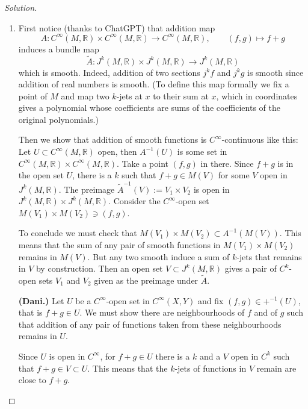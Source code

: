 \begin{proof}[Solution]
\begin{enumerate}[label=(\alph*)]
\item 
	First notice (thanks to ChatGPT) that addition map
	\[A: C^\infty(M,\mathbb{R}) \times C^\infty(M,\mathbb{R}) \to C^\infty(M,\mathbb{R}),\qquad  (f,g)\mapsto  f+g\]
	induces a bundle map
\[\tilde{A}:J^{k}(M,\mathbb{R})\times J^{k}(M,\mathbb{R})\longrightarrow J^{k}(M,\mathbb{R})\]
which is smooth. Indeed, addition of two sections \(j^kf\) and \(j^kg\) is smooth since addition of real numbers is smooth. (To define this map formally we fix a point of \(M\) and map two \(k\)-jets at \(x\) to their sum at \(x\), which in coordinates gives a polynomial whose coefficients are sums of the coefficients of the original polynomials.)

Then we show that addition of smooth functions is \(C^\infty\)-continuous like this: Let \(U \subset C^\infty(M,\mathbb{R})\) open, then \(A^{-1}(U)\) is some set in \(C^\infty(M,\mathbb{R}) \times C^\infty (M,\mathbb{R})\). Take a point \((f,g)\) in there. Since \(f+g\) is in the open set \(U\), there is a \(k\) such that \(f+g \in M(V)\) for some \(V\) open in \(J^k(M,\mathbb{R})\). The preimage \(\tilde{A}^{-1}(V):=V_1\times V_2\) is open in \(J^k(M,\mathbb{R})\times J^{k}(M,\mathbb{R})\). Consider the \(C^\infty\)-open set \(M(V_1) \times M(V_2) \ni (f,g)\).

To conclude we must check that \(M(V_1)\times M(V_2) \subset A^{-1}(M(V))\). This means that the sum of any pair of smooth functions in \(M(V_1) \times M(V_2)\) remains in \(M(V)\). But any two smooth induce a sum of \(k\)-jets that remains in \(V\) by construction.
\iffalse
	Then an open set \(V \subset J^{k}(M,\mathbb{R})\) gives a pair of \(C^k\)-open sets \(V_1\) and \(V_2\) given as the preimage under \(\tilde{A}\). 

	\textbf{(Dani.)} Let \(U\) be a \(C^\infty\)-open set in \(C^\infty(X,Y)\) and fix \((f,g) \in +^{-1}(U)\), that is \(f+g \in U\). We must show there are neighbourhoods of \(f\) and of \(g\) such that addition of any pair of functions taken from these neighbourhoods remains in \(U\).


	Since \(U\) is open in \(C^\infty\), for \(f+g \in U\) there is a \(k\) and a \(V\) open in \(C^k\) such that \(f + g \in V \subset U\). This means that the \(k\)-jets of functions in \(V\) remain are close to \(f+g\).


\end{enumerate}
\end{proof}
